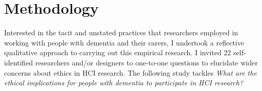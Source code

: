 
\section{Methodology}
\label{Ethics:Methodology}
Interested in the tacit and unstated practices that researchers employed in working with people with dementia and their carers, I undertook a reflective qualitative approach to carrying out this empirical research. I invited 22 self-identified researchers and/or designers to one-to-one questions to elucidate wider concerns about ethics in HCI research. The following study tackles \textit{What are the ethical implications for people with dementia to participate in HCI research?}

